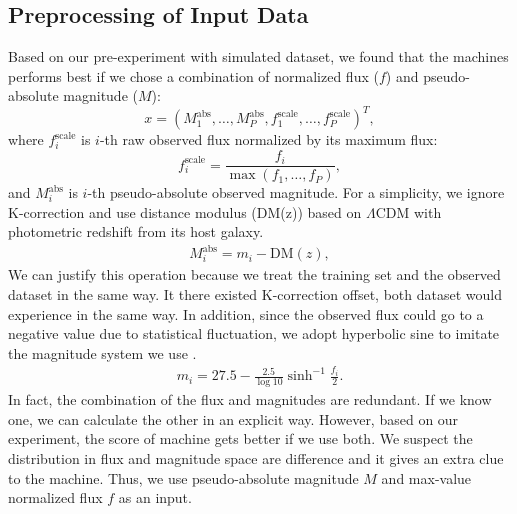 \documentclass[useamsfonts]{pasj01}
\begin{document}
\subsection{Preprocessing of Input Data}
Based on our pre-experiment with simulated dataset, we found that the machines performs best if we 
chose a combination of normalized flux ($f$) and pseudo-absolute magnitude ($M$):
\begin{equation}
    x = \left( M_1^\mathrm{abs}, \ldots, M_P^\mathrm{abs}, f_{1}^{\mathrm{scale}}, \ldots, f_{P}^{\mathrm{scale}} \right)^T,
\end{equation}
where $f_{i}^{\mathrm{scale}}$ is $i$-th raw observed flux normalized by its maximum flux:
\begin{equation}
    f_{i}^{\mathrm{scale}} = \frac{f_i}{\max \left(f_1, \ldots, f_P \right)},    \label{eq:scaled_flux}
\end{equation}
and $M_i^\mathrm{abs}$ is $i$-th pseudo-absolute observed magnitude.
For a simplicity, we ignore K-correction and use distance modulus (DM(z)) based on $\Lambda$CDM with photometric redshift
from its host galaxy.
\begin{eqnarray}
    M_i^\mathrm{abs} = m_i - \mathrm{DM}\left(z\right),
\end{eqnarray}
We can justify this operation because we treat the training set and the observed dataset in the same way.
It there existed K-correction offset, both dataset would experience in the same way.
In addition, since the observed flux could go to a negative value due to statistical fluctuation, 
we adopt hyperbolic sine to imitate the magnitude system we use \citep{lupton99a}.  
\begin{eqnarray}
    m_i = 27.5 - \frac{2.5}{\log 10} \sinh^{-1} \frac{f_i}{2}. \label{eq:mag} 
\end{eqnarray}
In fact, the combination of the flux and magnitudes are redundant.   If we know one, we can calculate the other
in an explicit way.   
However, based on our experiment, the score of machine gets better if we use both.  
We suspect the distribution in flux and magnitude space are difference and it gives an extra clue to the machine.
Thus, we use pseudo-absolute magnitude $M$ and max-value normalized flux $f$ as an input.
\end{document}
